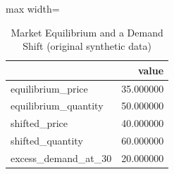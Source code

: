 \begin{table}[htbp]
\centering
\caption{Market Equilibrium and a Demand Shift (original synthetic data)}
\begingroup
\small
\setlength{\tabcolsep}{6pt}
\renewcommand{\arraystretch}{1.12}
\begin{adjustbox}{max width=\linewidth}
\begin{tabular}{@{}lr@{}}
\toprule
 & value \\
\midrule
equilibrium\_price & 35.000000 \\
equilibrium\_quantity & 50.000000 \\
shifted\_price & 40.000000 \\
shifted\_quantity & 60.000000 \\
excess\_demand\_at\_30 & 20.000000 \\
\bottomrule
\end{tabular}
\end{adjustbox}
\endgroup
\end{table}
